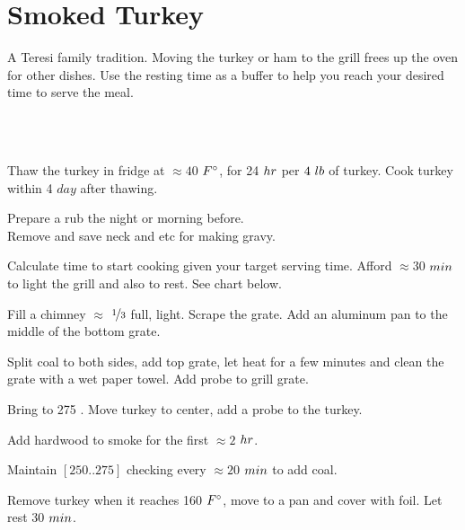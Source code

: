 \section{Smoked Turkey}


\begin{recipestats}[
	servings=1\onefourth~\pound/person,
	preptime=45~\minute,
	bakingtime=$\approx5~\hour$,
	inactivetime=30~\minute,
	source=Teresi~Family,
]
\end{recipestats}


\begin{recipeabstract}
	A Teresi family tradition.
	Moving the turkey or ham to the grill frees up the oven for other dishes.
	Use the resting time as a buffer to help you reach your desired time to serve the meal.
\end{recipeabstract}


\begin{ingredientcolumns}[1]
	\begin{ingredientblock}
		\\
		\\
	\end{ingredientblock}
\end{ingredientcolumns}


\begin{preparation}
\item Thaw the turkey in fridge at $\approx40$ $\Fahrenheit$, for 24 $\hour$ per $4~\pound$ of turkey.
	Cook turkey within 4 $day$ after thawing.
\item Prepare a rub the night or morning before.\\
	Remove and save neck and etc for making gravy.
\item Calculate time to start cooking given your target serving time.
	Afford $\approx30$ $\minute$ to light the grill and also to rest.
	See chart below.
\item Fill a chimney $\approx$ $\onethird$ full, light.
	Scrape the grate.
	Add an aluminum pan to the middle of the bottom grate.
\item Split coal to both sides, add top grate, let heat for a few minutes and clean the grate with a wet paper towel.
	Add probe to grill grate.
\item Bring to 275 \Fahrenheit.
	Move turkey to center, add a probe to the turkey.
\item Add hardwood to smoke for the first $\approx2$ $\hour$.
\item Maintain $[250..275]$ checking every $\approx20$ $\minute$ to add coal.
\item Remove turkey when it reaches 160 $\Fahrenheit$, move to a pan and cover with foil. Let rest 30 $\minute$.
\end{preparation}


